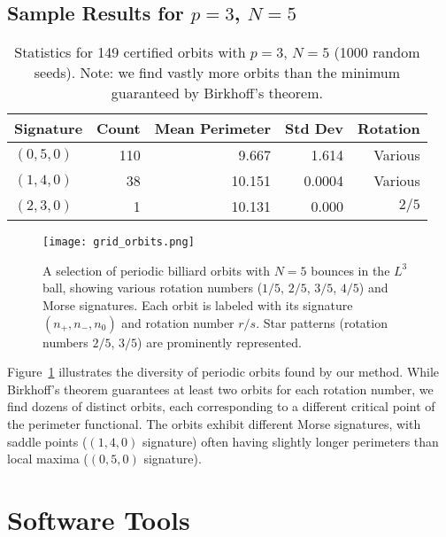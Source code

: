 \documentclass[11pt]{amsart}
\theoremstyle{plain}
\theoremstyle{definition}
\theoremstyle{remark}
\begin{document}
\subsection{Sample Results for $p = 3$, $N = 5$}

\begin{table}[h]
\centering
\begin{tabular}{@{}lrrrr@{}}
\toprule
Signature & Count & Mean Perimeter & Std Dev & Rotation \\
\midrule
$(0,5,0)$ & 110 & 9.667 & 1.614 & Various \\
$(1,4,0)$ & 38 & 10.151 & 0.0004 & Various \\
$(2,3,0)$ & 1 & 10.131 & 0.000 & $2/5$ \\
\bottomrule
\end{tabular}
\caption{Statistics for 149 certified orbits with $p = 3$, $N = 5$ (1000 random seeds). Note: we find vastly more orbits than the minimum guaranteed by Birkhoff's theorem.}
\end{table}

\begin{figure}[h]
\centering
\texttt{[image: grid\_orbits.png]}
\caption{A selection of periodic billiard orbits with \texorpdfstring{$N=5$}{N=5} bounces in the \texorpdfstring{$L^3$}{L3} ball, showing various rotation numbers (\texorpdfstring{$1/5$}{1/5}, \texorpdfstring{$2/5$}{2/5}, \texorpdfstring{$3/5$}{3/5}, \texorpdfstring{$4/5$}{4/5}) and Morse signatures. Each orbit is labeled with its signature \texorpdfstring{$(n_+, n_-, n_0)$}{(n+, n-, n0)} and rotation number \texorpdfstring{$r/s$}{r/s}. Star patterns (rotation numbers \texorpdfstring{$2/5$}{2/5}, \texorpdfstring{$3/5$}{3/5}) are prominently represented.}
\label{fig:grid_orbits}
\end{figure}

Figure~\ref{fig:grid_orbits} illustrates the diversity of periodic orbits found by our method. While Birkhoff's theorem guarantees at least two orbits for each rotation number, we find dozens of distinct orbits, each corresponding to a different critical point of the perimeter functional. The orbits exhibit different Morse signatures, with saddle points ($(1,4,0)$ signature) often having slightly longer perimeters than local maxima ($(0,5,0)$ signature).

\section{Software Tools}
\end{document}
